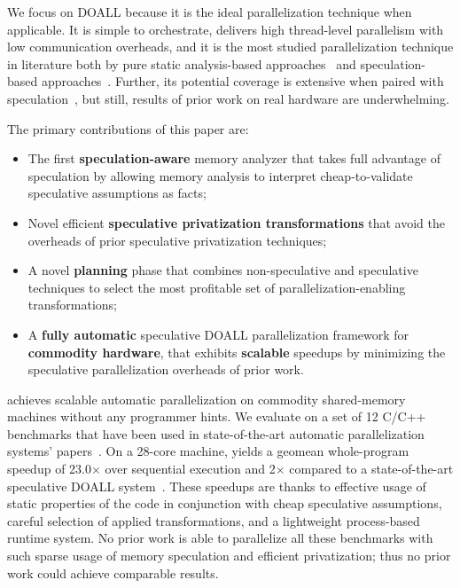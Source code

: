 We focus on DOALL because it is the ideal parallelization technique
when applicable. It is simple to orchestrate, delivers high
thread-level parallelism with low communication overheads, and it is
the most studied parallelization technique in literature both by pure
static analysis-based
approaches~\cite{suif:94:stanford,blume:94:polaris,rus:03:hybrid,rauchwerger:94:ics}
and speculation-based
approaches~\cite{rauchwerger:99:pds,dang:02:ipdps,mehrara:09:stmlite,kim:12:cgo,johnson:12:pldi}.  Further, its potential coverage is
extensive when paired with speculation~\cite{zhong:08:hpca}, but still,
results of prior work on real hardware are underwhelming.

The primary contributions of this paper are:
\begin{itemize}

\item The first \textbf{speculation-aware} memory analyzer that takes
full advantage of speculation by allowing memory analysis to interpret
cheap-to-validate speculative assumptions as facts;

\item Novel efficient \textbf{speculative privatization transformations}
that avoid the overheads of prior speculative privatization
techniques;

\item A novel \textbf{planning} phase that combines non-speculative
and speculative techniques to select the most profitable set of
parallelization-enabling transformations;

\item A \textbf{fully automatic} speculative DOALL parallelization
framework for \textbf{commodity hardware}, that exhibits
\textbf{scalable} speedups by minimizing the speculative
parallelization overheads of prior work.

\end{itemize}

\name achieves scalable automatic parallelization on commodity
shared-memory machines without any programmer hints.  We evaluate
\name on a set of 12 C/C++ benchmarks that have been used in
state-of-the-art automatic parallelization systems'
papers~\cite{johnson:12:pldi,kim:12:cgo,simone:12:cgo}. On a
28-core machine, \name yields a geomean whole-program speedup of
23.0$\times$ over sequential execution and 2$\times$ compared to a
state-of-the-art speculative DOALL system~\cite{johnson:12:pldi}.
These speedups are thanks to effective usage of static properties of
the code in conjunction with cheap speculative assumptions,
%
careful selection of applied transformations, and a lightweight
process-based runtime system.  No prior work is able to parallelize
all these benchmarks with such sparse usage of memory speculation and
efficient privatization; thus no prior work could achieve comparable results.
